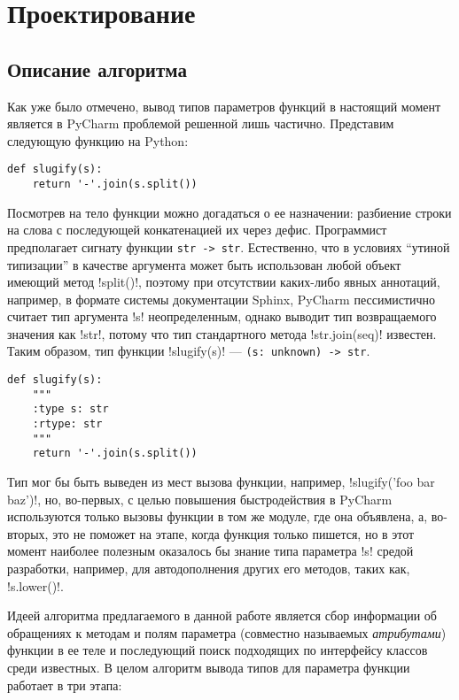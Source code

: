 \chapter{Проектирование}

\section{Описание алгоритма}

Как уже было отмечено, вывод типов параметров функций в настоящий момент
является в PyCharm проблемой решенной лишь частично. Представим следующую
функцию на Python:

\begin{lstlisting}
def slugify(s):
    return '-'.join(s.split())
\end{lstlisting}

Посмотрев на тело функции можно догадаться о ее назначении: разбиение строки на
слова с последующей конкатенацией их через дефис. Программист предполагает сигнату
функции \texttt{str -> str}. Естественно, что в условиях ``утиной
типизации'' в качестве аргумента может быть использован любой объект имеющий
метод !split()!, поэтому при отсутствии каких-либо явных аннотаций, например, в
формате системы документации Sphinx, PyCharm пессимистично считает тип аргумента
!s! неопределенным, однако выводит тип возвращаемого значения как !str!, потому
что тип стандартного метода !str.join(seq)! известен. Таким образом, тип функции
!slugify(s)! --- \texttt{(s: unknown) -> str}.

\begin{lstlisting}
def slugify(s):
    """
    :type s: str
    :rtype: str
    """
    return '-'.join(s.split())
\end{lstlisting}

Тип мог бы быть выведен из мест вызова функции, например, 
!slugify('foo bar baz')!, но, во-первых, с целью повышения быстродействия в
PyCharm используются только вызовы функции в том же модуле, где она объявлена,
а, во-вторых, это не поможет на этапе, когда функция только пишется, но
в этот момент наиболее полезным оказалось бы знание типа параметра !s!
средой разработки, например, для автодополнения других его методов, таких как,
!s.lower()!.

Идеей алгоритма предлагаемого в данной работе является сбор информации об
обращениях к методам и полям параметра (совместно называемых \emph{атрибутами})
функции в ее теле и последующий поиск подходящих по интерфейсу классов среди
известных. В целом алгоритм вывода типов для параметра функции работает в три этапа:

